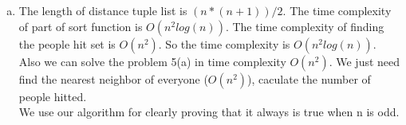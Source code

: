 \documentclass[12pt]{article}
\begin{document}
\begin{enumerate}
\begin{enumerate}[(a)]
\item
  The length of distance tuple list is $(n*(n+1))/2$.
  The time complexity of part of sort function is $O(n^2log(n))$. 
  The time complexity of finding the people hit set is $O(n^2)$. 
  So the time complexity is $O(n^2log(n))$. \\

  Also we can solve the problem 5(a) in time complexity $O(n^2)$. 
  We just need find the nearest neighbor of everyone ($O(n^2)$), caculate the number of people hitted. \\
  
  We use our algorithm for clearly proving that it always is true when n is odd.
\end{enumerate}  
\end{enumerate}
\end{document}
